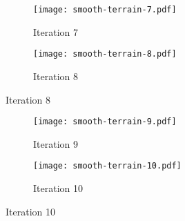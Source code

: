 \documentclass[10pt]{article}
\begin{document}
\begin{figure}[H]
	\begin{subfigure}[b]{0.5\textwidth}
		\texttt{[image: smooth-terrain-7.pdf]}
		\caption{Iteration 7}
	\end{subfigure}
	\begin{subfigure}[b]{0.5\textwidth}
		\texttt{[image: smooth-terrain-8.pdf]}
		\caption{Iteration 8}
	\end{subfigure}
\end{figure}
\begin{figure}[H]
	\begin{subfigure}[b]{0.5\textwidth}
		\texttt{[image: smooth-terrain-9.pdf]}
		\caption{Iteration 9}
	\end{subfigure}
	\begin{subfigure}[b]{0.5\textwidth}
		\texttt{[image: smooth-terrain-10.pdf]}
		\caption{Iteration 10}
	\end{subfigure}
\end{figure}
%
\end{document}
